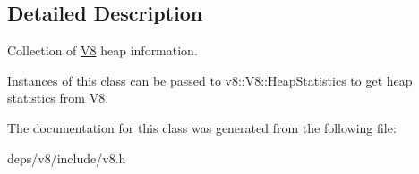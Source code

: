 \subsection{Detailed Description}
Collection of \hyperlink{classv8_1_1_v8}{V8} heap information.

Instances of this class can be passed to v8\+::\+V8\+::\+Heap\+Statistics to get heap statistics from \hyperlink{classv8_1_1_v8}{V8}. 

The documentation for this class was generated from the following file\+:\begin{DoxyCompactItemize}
\item 
deps/v8/include/v8.\+h\end{DoxyCompactItemize}
